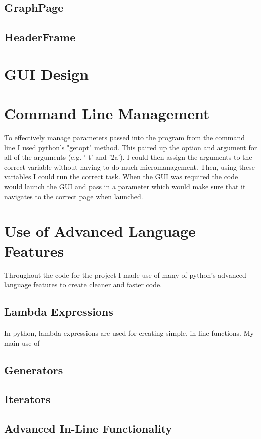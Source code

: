 \documentclass[11pt]{report}
\begin{document}
\subsection{GraphPage}


\subsection{HeaderFrame}

\section{GUI Design}

\section{Command Line Management}
To effectively manage parameters passed into the program from the command line I used python's "getopt" method.  This paired up the option and argument for all of the arguments (e.g. '-t' and '2a').  I could then assign the arguments to the correct variable without having to do much micromanagement.  Then, using these variables I could run the correct task.  When the GUI was required the code would launch the GUI and pass in a parameter which would make sure that it navigates to the correct page when launched.

\section{Use of Advanced Language Features}
Throughout the code for the project I made use of many of python's advanced language features to create cleaner and faster code.
\subsection{Lambda Expressions}
In python, lambda expressions are used for creating simple, in-line functions.  My main use of 
\subsection{Generators}
\subsection{Iterators}
\subsection{Advanced In-Line Functionality}
\end{document}
